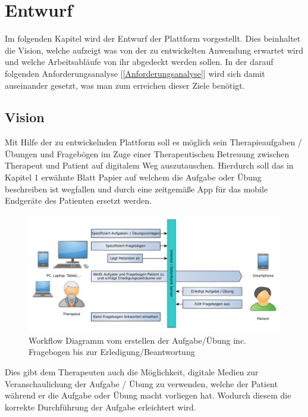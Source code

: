 
\chapter{Entwurf}\label{Entwurf} 
Im folgenden Kapitel wird der Entwurf der Plattform vorgestellt. Dies beinhaltet die Vision, welche aufzeigt was von der zu entwickelten Anwendung erwartet wird und welche Arbeitsabläufe von ihr abgedeckt werden sollen.
In der darauf folgenden Anforderungsanalyse [\ref{Anforderungsanalyse}] wird sich damit auseinander gesetzt, was man zum erreichen dieser Ziele benötigt. 

\section{Vision}\label{Vision}
Mit Hilfe der zu entwickelnden Plattform soll es möglich sein Therapieaufgaben / Übungen und Fragebögen im Zuge einer Therapeutischen Betreuung zwischen Therapeut und Patient auf digitalem Weg auszutauschen. Hierdurch soll das in Kapitel 1 erwähnte Blatt Papier auf welchem die Aufgabe oder Übung beschreiben ist wegfallen und durch eine zeitgemäße App für das mobile Endgeräte des Patienten ersetzt werden.

\begin{figure}[H]
	\centering
	\includegraphics[scale=0.6]{images/AblaufAbstrakt}
	\caption[Workflow Diagramm vom erstellen der Aufgabe/Übung inc. Fragebogen bis zur Erledigung/Beantwortung]{Workflow Diagramm vom erstellen der Aufgabe/Übung inc. Fragebogen bis zur Erledigung/Beantwortung}
	\label{AblaufAbstrakt}
\end{figure}

Dies gibt dem Therapeuten auch die Möglichkeit, digitale Medien zur Veranschaulichung der Aufgabe / Übung zu verwenden, welche der Patient während er die Aufgabe oder Übung macht vorliegen hat. Wodurch diesem die korrekte Durchführung der Aufgabe erleichtert wird.


